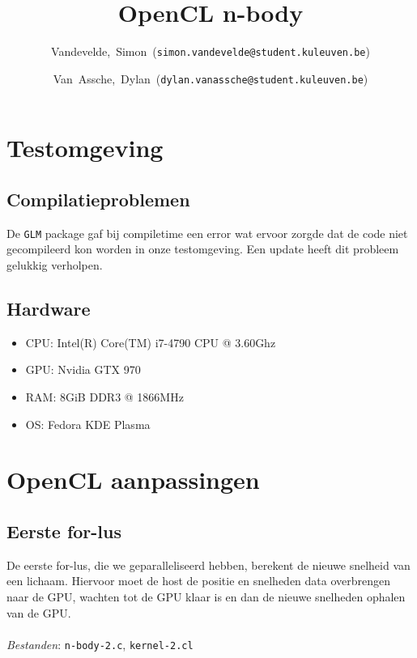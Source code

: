 \documentclass{article}
\title{OpenCL n-body}
\author{Vandevelde,~Simon~(\texttt{simon.vandevelde@student.kuleuven.be})
  \and
  Van~Assche,~Dylan~(\texttt{dylan.vanassche@student.kuleuven.be})}
\begin{document}
\maketitle %

\section{Testomgeving}
\subsection{Compilatieproblemen}

De \texttt{GLM} package gaf bij compiletime een error wat
ervoor zorgde dat de code niet gecompileerd kon worden in onze testomgeving.
Een update heeft dit probleem gelukkig verholpen.

\subsection{Hardware}
\begin{itemize}
    \item CPU: Intel(R) Core(TM) i7-4790 CPU @ 3.60Ghz
    \item GPU: Nvidia GTX 970
    \item RAM: 8GiB DDR3 @ 1866MHz
    \item OS: Fedora KDE Plasma
\end{itemize}

\section{OpenCL aanpassingen}
\subsection{Eerste for-lus}
\label{hfd:niet-atomisch-for1}
De eerste for-lus, die we geparalleliseerd hebben, berekent de nieuwe snelheid van een lichaam.
Hiervoor moet de host de positie en snelheden data overbrengen naar de GPU, wachten tot de GPU
klaar is en dan de nieuwe snelheden ophalen van de GPU.
\\
\\
\textit{Bestanden}: \texttt{n-body-2.c}, \texttt{kernel-2.cl}
\end{document}
